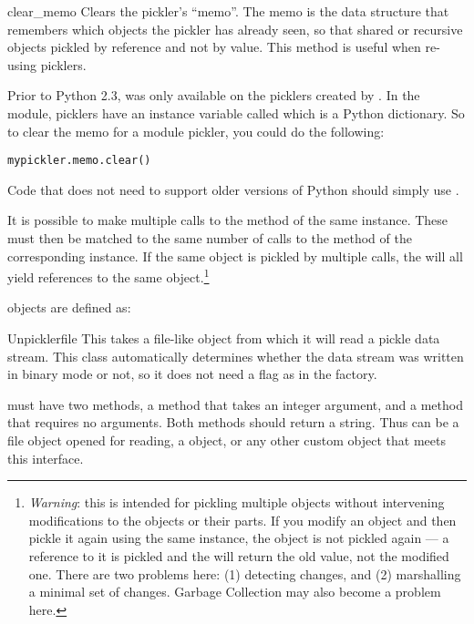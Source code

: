 \begin{methoddesc}[Pickler]{clear_memo}{}
Clears the pickler's ``memo''.  The memo is the data structure that
remembers which objects the pickler has already seen, so that shared
or recursive objects pickled by reference and not by value.  This
method is useful when re-using picklers.

\begin{notice}
Prior to Python 2.3,  was only available on the
picklers created by .  In the  module,
picklers have an instance variable called  which is a
Python dictionary.  So to clear the memo for a  module
pickler, you could do the following:

\begin{verbatim}
mypickler.memo.clear()
\end{verbatim}

Code that does not need to support older versions of Python should
simply use .
\end{notice}
\end{methoddesc}

It is possible to make multiple calls to the  method of
the same  instance.  These must then be matched to the
same number of calls to the  method of the
corresponding  instance.  If the same object is
pickled by multiple  calls, the  will
all yield references to the same object.\footnote{\emph{Warning}: this
is intended for pickling multiple objects without intervening
modifications to the objects or their parts.  If you modify an object
and then pickle it again using the same  instance, the
object is not pickled again --- a reference to it is pickled and the
 will return the old value, not the modified one.
There are two problems here: (1) detecting changes, and (2)
marshalling a minimal set of changes.  Garbage Collection may also
become a problem here.}

 objects are defined as:

\begin{classdesc}{Unpickler}{file}
This takes a file-like object from which it will read a pickle data
stream.  This class automatically determines whether the data stream
was written in binary mode or not, so it does not need a flag as in
the  factory.

 must have two methods, a  method that takes
an integer argument, and a  method that requires no
arguments.  Both methods should return a string.  Thus  can
be a file object opened for reading, a
 object, or any other custom
object that meets this interface.
\end{classdesc}


